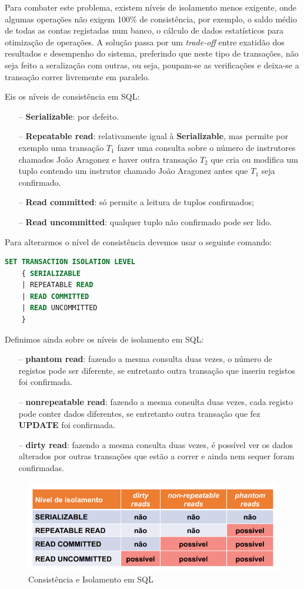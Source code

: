 \documentclass[oneside]{book}
\theoremstyle{definition}
\begin{document}
Para combater este problema, existem níveis de isolamento menos exigente, onde algumas operações não exigem 100\% de consistência, por exemplo, o saldo médio de todas as contas registadas num banco, o cálculo de dados estatísticos para otimização de operações. A solução passa por um \textit{trade-off} entre exatidão dos resultados e desempenho do sistema, preferindo que neste tipo de transações, não seja feito a seralização com outras, ou seja, poupam-se as verificações e deixa-se a transação correr livremente em paralelo.

Eis os níveis de consistência em SQL:
\begin{itemize}
    \itemsep0cm
    \item[--] \textbf{Serializable}: por defeito.
    \item[--] \textbf{Repeatable read}: relativamente igual à \textbf{Serializable}, mas permite por exemplo uma transação $T_1$ fazer uma consulta sobre o número de instrutores chamados João Aragonez e haver outra transação $T_2$ que cria ou modifica um tuplo contendo um instrutor chamado João Aragonez antes que $T_1$ seja confirmado.
    \item[--] \textbf{Read committed}: só permite a leitura de tuplos confirmados;
    \item[--] \textbf{Read uncommitted}: qualquer tuplo não confirmado pode ser lido.
\end{itemize}
Para alterarmos o nível de consistência devemos usar o seguinte comando:
\begin{lstlisting}[language=SQL, morekeywords={REFERENCES, REFRESH, MATERIALIZED, CONCURRENTLY, UNCOMMITTED, COMMITTED, REPEATABLE, SERIALIZABLE}, framesep=8pt, xleftmargin=40pt, framexleftmargin=40pt, frame=tb, framerule=0pt]
SET TRANSACTION ISOLATION LEVEL
    { SERIALIZABLE
    | REPEATABLE READ
    | READ COMMITTED
    | READ UNCOMMITTED
    }
\end{lstlisting}

Definimos ainda sobre os níveis de isolamento em SQL:
\begin{itemize}
    \itemsep0cm
    \item[--] \textbf{phantom read}: fazendo a mesma consulta duas vezes, o número de registos pode ser diferente, se entretanto outra transação que inseriu registos foi confirmada.
    \item[--] \textbf{nonrepeatable read}: fazendo a mesma consulta duas vezes, cada registo pode conter dados diferentes, se entretanto outra transação que fez \textbf{UPDATE} foi confirmada.
    \item[--] \textbf{dirty read}: fazendo a mesma consulta duas vezes, é possível ver os dados alterados por outras transações que estão a correr e ainda nem sequer foram confirmadas.
\end{itemize}

\begin{figure}[H]
    \centering
    \includegraphics[scale = 0.4]{cap_transct/isolamento_transacoes.png}
    \caption{Consistência e Isolamento em SQL}
\end{figure}
\end{document}
